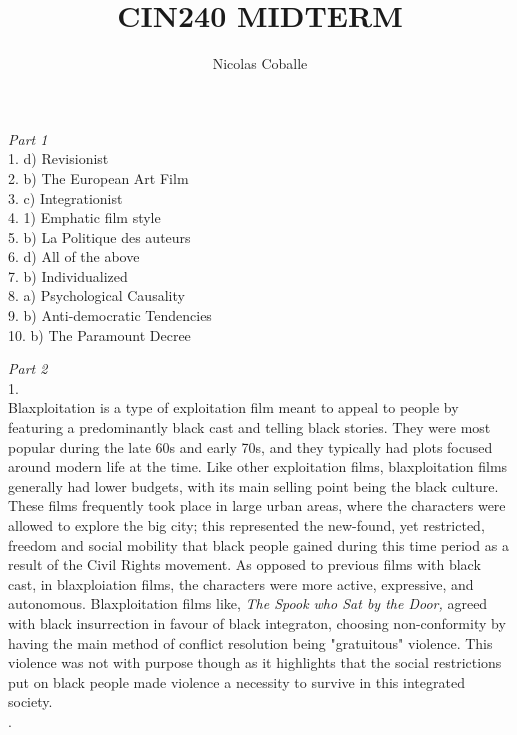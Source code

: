 \documentclass[12pt]{article}
\title{CIN240 MIDTERM}
\author{Nicolas Coballe}
\begin{document}
\maketitle
\begin{flushleft}
\textit{Part 1} \\
1. d) Revisionist \\
2. b) The European Art Film\\
3. c) Integrationist \\
4. 1) Emphatic film style\\
5. b) La Politique des auteurs \\
6. d) All of the above \\
7. b) Individualized \\
8. a) Psychological Causality\\
9. b) Anti-democratic Tendencies\\
10. b) The Paramount Decree 
\newpage

\textit{Part 2} \\
1. \\
Blaxploitation is a type of exploitation film meant to appeal to people by featuring a predominantly black cast and telling black stories. They were most popular during the late 60s and early 70s, and they typically had plots focused around modern life at the time. Like other exploitation films, blaxploitation films generally had lower budgets, with its main selling point being the black culture. These films frequently took place in large urban areas, where the characters were allowed to explore the big city; this represented the new-found, yet restricted, freedom and social mobility that black people gained during this time period as a result of the Civil Rights movement. As opposed to previous films with black cast, in blaxploiation films, the characters were more active, expressive, and autonomous. Blaxploitation films like, \textit{The Spook who Sat by the Door,} agreed with black insurrection in favour of black integraton, choosing non-conformity by having the main method of conflict resolution being "gratuitous" violence. This violence was not with purpose though as it highlights that the social restrictions put on black people made violence a necessity to survive in this integrated society.\\
. \\



\end{flushleft}
\end{document}
